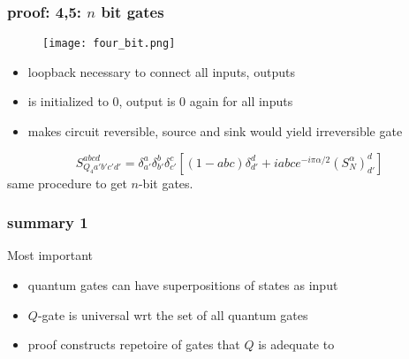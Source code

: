 \documentclass{beamer}
\begin{document}
\begin{frame}
	\frametitle{proof: 4,5: $n$ bit gates}
	\begin{figure}
		\centering
		\texttt{[image: four\_bit.png]}
	\end{figure}
	\begin{itemize}
		\item loopback necessary to connect all inputs, outputs
		\item is initialized to $0$, output is $0$ again for all inputs
		\item makes circuit reversible, source and sink would yield irreversible gate
	\end{itemize}
	\begin{equation*}
     S_{Q_4a'b'c'd'}^{abcd}=\delta_{a'}^{a}\delta_{b'}^b\delta_{c'}^c[(1-abc)\delta_{d'}^d+iabc e^{-i\pi\alpha/2}(S_N^\alpha)_{d'}^d]
    \end{equation*}
    same procedure to get $n$-bit gates.\\
\end{frame}
%
\begin{frame}
	\frametitle{summary 1}
    \begin{block}{Most important}
        \begin{itemize}
			\item quantum gates can have superpositions of states as input
			\item $Q$-gate is universal wrt the set of all quantum gates
			\item proof constructs repetoire of gates that $Q$ is adequate to
		\end{itemize}
    \end{block}
\end{frame}
%
%
\end{document}

